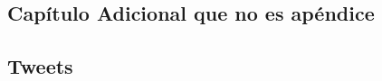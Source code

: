 \begin{additional} 
\section{Capítulo Adicional que no es apéndice}
\end{additional}

\begin{appendix} 
\section{Tweets}
\end{appendix}

